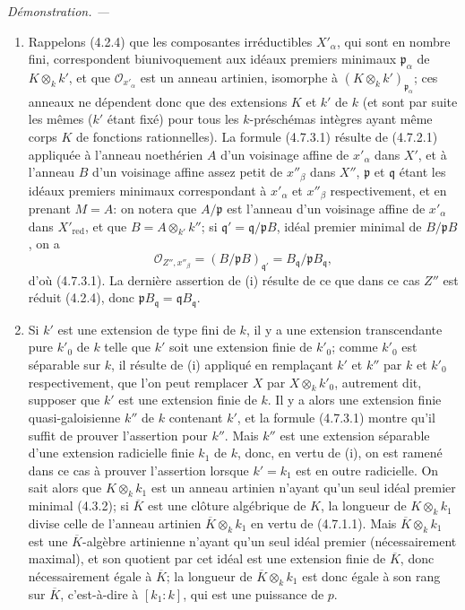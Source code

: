 \documentclass[10pt,oneside]{book}
\newenvironment{proof}{%
  \par\medskip\noindent\textit{Démonstration. ---\ }}{\par}
\begin{document}
\begin{proof}
\begin{enumerate}
\item[(i)] Rappelons (4.2.4) que les composantes irréductibles $X'_\alpha$,
qui sont en nombre fini, correspondent biunivoquement aux idéaux premiers
minimaux $\mathfrak p_\alpha$ de $K\otimes_k k'$, et que
$\mathcal O_{x'_\alpha}$ est un anneau artinien, isomorphe à
$(K\otimes_k k')_{\mathfrak p_\alpha}$; ces anneaux ne dépendent donc que des
extensions $K$ et $k'$ de $k$ (et sont par suite les mêmes ($k'$ étant fixé)
pour tous les $k$-préschémas intègres ayant même corps $K$ de fonctions
rationnelles). La formule (4.7.3.1) résulte de (4.7.2.1) appliquée à l'anneau
noethérien $A$ d'un voisinage affine de $x'_\alpha$ dans $X'$, et à l'anneau
$B$ d'un voisinage affine assez petit de $x''_\beta$ dans $X''$, $\mathfrak p$
et $\mathfrak q$ étant les idéaux premiers minimaux correspondant à
$x'_\alpha$ et $x''_\beta$ respectivement, et en prenant $M=A$: on notera que
$A/\mathfrak p$ est l'anneau d'un voisinage affine de $x'_\alpha$ dans
$X'_{\mathrm{red}}$, et que $B=A\otimes_{k'}k''$; si
$\mathfrak q'=\mathfrak q/\mathfrak pB$, idéal premier minimal de
$B/\mathfrak pB$, on a
\[
\mathcal O_{Z'',x''_\beta}
=(B/\mathfrak pB)_{\mathfrak q'}
=B_{\mathfrak q}/\mathfrak pB_{\mathfrak q},
\]
d'où (4.7.3.1). La dernière assertion de (i) résulte de ce que dans ce cas
$Z''$ est réduit (4.2.4), donc
$\mathfrak pB_{\mathfrak q}=\mathfrak qB_{\mathfrak q}$.

\item[(ii)] Si $k'$ est une extension de type fini de $k$, il y a une
extension transcendante pure $k'_0$ de $k$ telle que $k'$ soit une extension
finie de $k'_0$; comme $k'_0$ est séparable sur $k$, il résulte de (i)
appliqué en remplaçant $k'$ et $k''$ par $k$ et $k'_0$ respectivement, que
l'on peut remplacer $X$ par $X\otimes_k k'_0$, autrement dit, supposer que
$k'$ est une extension finie de $k$. Il y a alors une extension finie
quasi-galoisienne $k''$ de $k$ contenant $k'$, et la formule (4.7.3.1) montre
qu'il suffit de prouver l'assertion pour $k''$. Mais $k''$ est une extension
séparable d'une extension radicielle finie $k_1$ de $k$, donc, en vertu de
(i), on est ramené dans ce cas à prouver l'assertion lorsque $k'=k_1$ est en
outre radicielle. On sait alors que $K\otimes_k k_1$ est un anneau artinien
n'ayant qu'un seul idéal premier minimal (4.3.2); si $\overline K$ est une
clôture algébrique de $K$, la longueur de $K\otimes_k k_1$ divise celle de
l'anneau artinien $\overline K\otimes_k k_1$ en vertu de (4.7.1.1). Mais
$\overline K\otimes_k k_1$ est une $\overline K$-algèbre artinienne n'ayant
qu'un seul idéal premier (nécessairement maximal), et son quotient par cet
idéal est une extension finie de $\overline K$, donc nécessairement égale à
$\overline K$; la longueur de $\overline K\otimes_k k_1$ est donc égale à son
rang sur $\overline K$, c'est-à-dire à $[k_1:k]$, qui est une puissance de
$p$.


\end{enumerate}
\end{proof}
\end{document}
